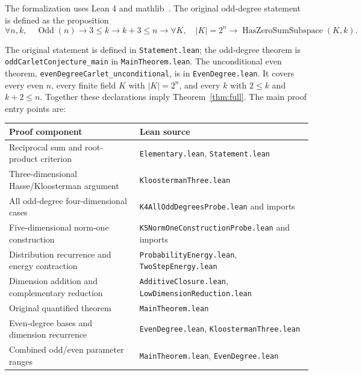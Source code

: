 \documentclass[11pt]{amsart}
\numberwithin{equation}{section}
\theoremstyle{definition}
\theoremstyle{remark}
\begin{document}
The formalization uses Lean 4 and mathlib~\cite{Lean4,Mathlib}. The original odd-degree statement is defined as the proposition
\[
\forall n,k,\quad \operatorname{Odd}(n)\to 3\le k\to k+3\le n\to
\forall K,\quad |K|=2^n\to \operatorname{HasZeroSumSubspace}(K,k).
\]
{\raggedright
The original statement is defined in \texttt{Statement.lean}; the odd-degree theorem is \texttt{oddCarletConjecture\_main} in \texttt{MainTheorem.lean}.
The unconditional even theorem, \texttt{evenDegreeCarlet\_unconditional}, is in \texttt{EvenDegree.lean}. It covers every even $n$, every finite field $K$ with $|K|=2^n$, and every $k$ with $2\le k$ and $k+2\le n$.
Together these declarations imply Theorem~\ref{thm:full}. The main proof entry points are:
\par}
\begin{center}
\small\begin{tabular}{>{\raggedright\arraybackslash}p{}>{\raggedright\arraybackslash}p{}}
\toprule
Proof component & Lean source\\
\midrule
Reciprocal sum and root-product criterion & \texttt{Elementary.lean}, \texttt{Statement.lean}\\
Three-dimensional Hasse/Kloosterman argument & \texttt{KloostermanThree.lean}\\
All odd-degree four-dimensional cases & \texttt{K4AllOddDegreesProbe.lean} and imports\\
Five-dimensional norm-one construction & \texttt{K5NormOneConstructionProbe.lean} and imports\\
Distribution recurrence and energy contraction & \texttt{ProbabilityEnergy.lean}, \texttt{TwoStepEnergy.lean}\\
Dimension addition and complementary reduction & \texttt{AdditiveClosure.lean}, \texttt{LowDimensionReduction.lean}\\
Original quantified theorem & \texttt{MainTheorem.lean}\\
Even-degree bases and dimension recurrence & \texttt{EvenDegree.lean}, \texttt{KloostermanThree.lean}\\
Combined odd/even parameter ranges & \texttt{MainTheorem.lean}, \texttt{EvenDegree.lean}\\
\bottomrule
\end{tabular}
\end{center}
\end{document}
